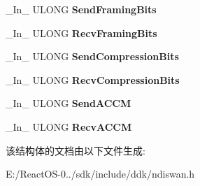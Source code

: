 \begin{DoxyCompactItemize}
\+\_\+\+In\+\_\+ U\+L\+O\+NG {\bfseries Send\+Framing\+Bits}
\item 
\mbox{\label{struct___n_d_i_s___w_a_n___s_e_t___l_i_n_k___i_n_f_o_a2f96ffdc6f6a7e9f038a0b53cf441d1e}} 
\+\_\+\+In\+\_\+ U\+L\+O\+NG {\bfseries Recv\+Framing\+Bits}
\item 
\mbox{\label{struct___n_d_i_s___w_a_n___s_e_t___l_i_n_k___i_n_f_o_a924d1f580d4a4b76870241e9e9e3151c}} 
\+\_\+\+In\+\_\+ U\+L\+O\+NG {\bfseries Send\+Compression\+Bits}
\item 
\mbox{\label{struct___n_d_i_s___w_a_n___s_e_t___l_i_n_k___i_n_f_o_a0a523ba93b7e466b138192a894e6f91c}} 
\+\_\+\+In\+\_\+ U\+L\+O\+NG {\bfseries Recv\+Compression\+Bits}
\item 
\mbox{\label{struct___n_d_i_s___w_a_n___s_e_t___l_i_n_k___i_n_f_o_ab62d813d7e85e38dcaca3f6961ff85f9}} 
\+\_\+\+In\+\_\+ U\+L\+O\+NG {\bfseries Send\+A\+C\+CM}
\item 
\mbox{\label{struct___n_d_i_s___w_a_n___s_e_t___l_i_n_k___i_n_f_o_a2ec5ed6cb202c29b79d7e3b5d3552b22}} 
\+\_\+\+In\+\_\+ U\+L\+O\+NG {\bfseries Recv\+A\+C\+CM}
\end{DoxyCompactItemize}


该结构体的文档由以下文件生成\+:\begin{DoxyCompactItemize}
\item 
E\+:/\+React\+O\+S-\/0../sdk/include/ddk/ndiswan.\+h\end{DoxyCompactItemize}
